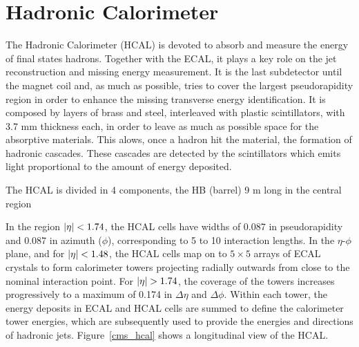 
\section{Hadronic Calorimeter}

The Hadronic Calorimeter (HCAL) is devoted to absorb and measure the energy of final states hadrons. Together with the ECAL, it plays a key role on the jet reconstruction and missing energy measurement. It is the last subdetector until the magnet coil and, as much as possible, tries to cover the largest pseudorapidity region in order to enhance the missing transverse energy identification. It is composed by layers of brass and steel, interleaved with plastic scintillators, with 3.7 mm thickness each, in order to leave as much as possible space for the absorptive materials. This alows, once a hadron hit the material, the formation of hadronic cascades. These cascades are detected by the scintillators which emits light proportional to the amount of energy deposited.

The HCAL is divided in 4 components, the HB (barrel) 9 m long in the central region

In the region $\lvert \eta \rvert < 1.74$, the HCAL cells have widths of 0.087 in pseudorapidity and 0.087 in azimuth ($\phi$), corresponding to 5 to 10 interaction lengths. In the $\eta$-$\phi$ plane, and for $\lvert \eta \rvert < 1.48$, the HCAL cells map on to $5 \times 5$ arrays of ECAL crystals to form calorimeter towers projecting radially outwards from close to the nominal interaction point. For $\lvert \eta \rvert > 1.74$, the coverage of the towers increases progressively to a maximum of 0.174 in $\Delta \eta$ and $\Delta \phi$. Within each tower, the energy deposits in ECAL and HCAL cells are summed to define the calorimeter tower energies, which are subsequently used to provide the energies and directions of hadronic jets. Figure~\ref{cms_hcal} shows a longitudinal view of the HCAL.

